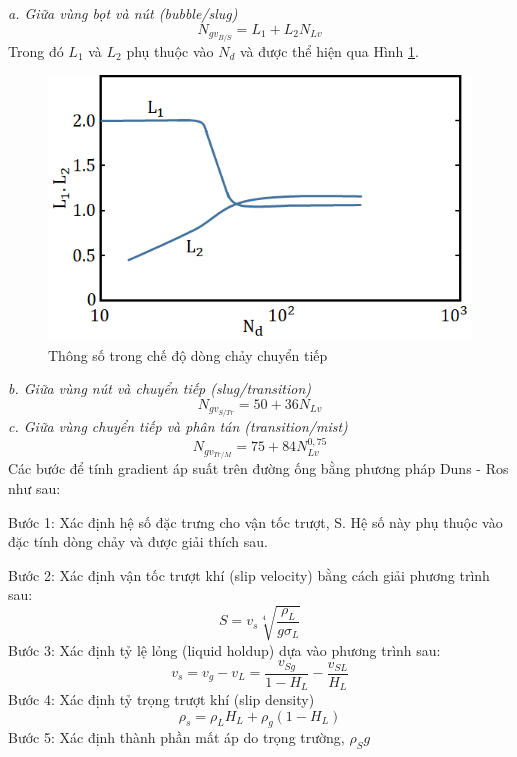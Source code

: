 \documentclass[12pt,a4paper]{report}
\begin{document}
\textit{a. Giữa vùng bọt và nút (bubble/slug)}
	\begin{equation}
	N_{gv_{B/S}} = L_1 + L_2N_{Lv}
	\end{equation}
Trong đó $L_1$ và $L_2$ phụ thuộc vào $N_d$ và được thể hiện qua Hình \ref{fig:L_one_L_two_params}.
	\begin{figure}[h]
		\centering
		\includegraphics[scale=0.8]{Fig/L_one_L_two_params.png}
		\caption[Thông số trong chế độ dòng chảy chuyển tiếp]{Thông số trong chế độ dòng chảy chuyển tiếp \cite{brill1999multiphase}}
		\label{fig:L_one_L_two_params}
	\end{figure}
\newpage
\textit{b. Giữa vùng nút và chuyển tiếp (slug/transition)}
	\begin{equation}
	N_{gv_{S/Tr}} = 50 + 36N_{Lv}
	\end{equation}
\textit{c. Giữa vùng chuyển tiếp và phân tán (transition/mist)}
	\begin{equation}
	N_{gv_{Tr/M}} = 75 + 84N_{Lv}^{0,75}
	\end{equation}
Các bước để tính gradient áp suất trên đường ống bằng phương pháp Duns - Ros như sau:

Bước 1: Xác định hệ số đặc trưng cho vận tốc trượt, S. Hệ số này phụ thuộc vào đặc tính dòng chảy và được giải thích sau.

Bước 2: Xác định vận tốc trượt khí (slip velocity) bằng cách giải phương trình sau:
	\begin{equation}
	S = v_s\sqrt[4]{\dfrac{\rho_L}{g\sigma_L}}
	\end{equation}
Bước 3: Xác định tỷ lệ lỏng (liquid holdup) dựa vào phương trình sau:
	\begin{equation}
    v_s = v_g - v_L = \dfrac{v_{Sg}}{1-H_L}-\dfrac{v_{SL}}{H_L}
	\end{equation}
Bước 4: Xác định tỷ trọng trượt khí (slip density)
	\begin{equation}
    \rho_s = \rho_LH_L + \rho_g(1-H_L)
	\end{equation}
Bước 5: Xác định thành phần mất áp do trọng trường, $\rho_Sg$
\end{document}
